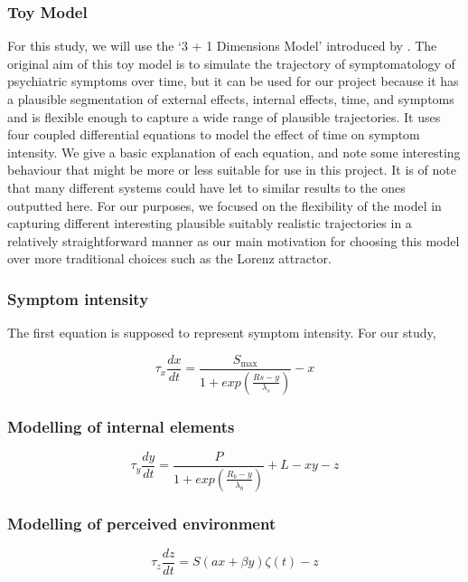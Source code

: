 \documentclass[utf8]{FrontiersinVancouver}
\begin{document}
\subsubsection{Toy Model}
For this study, we will use the `3 + 1 Dimensions Model' introduced by \citep{gauldDynamicalSystemsComputational2023}. The original aim of this toy model is to simulate the trajectory of symptomatology of psychiatric symptoms over time, but it can be used for our project because it has a plausible segmentation of external effects, internal effects, time, and symptoms and is flexible enough to capture a wide range of plausible trajectories. It uses four coupled differential equations to model the effect of time on symptom intensity. We give a basic explanation of each equation, and note some interesting behaviour that might be more or less suitable for use in this project. It is of note that many different systems could have let to similar results to the ones outputted here. For our purposes, we focused on the flexibility of the model in capturing different interesting plausible suitably realistic trajectories in a relatively straightforward manner as our main motivation for choosing this model over more traditional choices such as the Lorenz attractor.  

\subsubsection{Symptom intensity}
The first equation is supposed to represent symptom intensity. For our study, 

\begin{equation}
    \tau_{x}\frac{dx}{dt} = \frac{S_{\max}}{1+exp(\frac{Rs-y}{\lambda_{s}})} - x
\end{equation}


\subsubsection{Modelling of internal elements}

\begin{equation}
    \tau_{y}\frac{dy}{dt} = \frac{P}{1+exp(\frac{R_{b}-y}{\lambda_{b}})} + L - xy - z
\end{equation}

\subsubsection{Modelling of perceived environment}

\begin{equation}
    \tau_{z}\frac{dz}{dt} = S(ax + \beta y)\zeta(t) - z
\end{equation}
\end{document}
